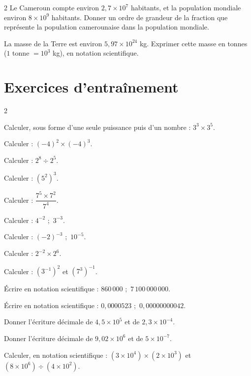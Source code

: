 \begin{multicols}{2}
\exo{} Le Cameroun compte environ $2{,}7\times10^{7}$ habitants, et la population
mondiale environ $8\times10^{9}$ habitants. Donner un ordre de grandeur de la fraction que
représente la population camerounaise dans la population mondiale.

\exo{} La masse de la Terre est environ $5{,}97\times10^{24}$ kg. Exprimer cette masse
en tonnes ($1$ tonne $=10^{3}$ kg), en notation scientifique.

\end{multicols}

\section{Exercices d'entraînement}
\begin{multicols}{2}

\exo{} Calculer, sous forme d'une seule puissance puis d'un nombre : $3^{3}\times3^{5}$.

\exo{} Calculer : $(-4)^{2}\times(-4)^{3}$.

\exo{} Calculer : $2^{8}\div2^{5}$.

\exo{} Calculer : $\left(5^{2}\right)^{3}$.

\exo{} Calculer : $\dfrac{7^{5}\times7^{2}}{7^{4}}$.

\exo{} Calculer : $4^{-2}$ ;\ $3^{-3}$.

\exo{} Calculer : $(-2)^{-3}$ ;\ $10^{-5}$.

\exo{} Calculer : $2^{-2}\times2^{6}$.

\exo{} Calculer : $\left(3^{-1}\right)^{2}$ et $\left(7^{3}\right)^{-1}$.

\exo{} Écrire en notation scientifique : $860\,000$ ;\ $7\,100\,000\,000$.

\exo{} Écrire en notation scientifique : $0{,}0000523$ ;\ $0{,}00000000042$.

\exo{} Donner l'écriture décimale de $4{,}5\times10^{5}$ et de $2{,}3\times10^{-4}$.

\exo{} Donner l'écriture décimale de $9{,}02\times10^{6}$ et de $5\times10^{-7}$.

\exo{} Calculer, en notation scientifique : $(3\times10^{4})\times(2\times10^{3})$ et
$(8\times10^{6})\div(4\times10^{2})$.


\end{multicols}
